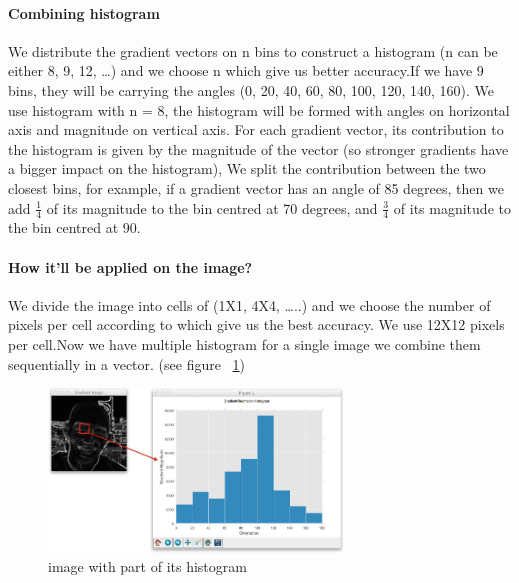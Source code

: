 \paragraph{}
\paragraph{Combining histogram}
We distribute the gradient vectors on n bins to construct a histogram (n can be either 8, 9, 12, …) and we choose n which give us better accuracy.\newline If we have 9 bins, they will be carrying the angles (0, 20, 40, 60, 80, 100, 120, 140, 160). \newline We use histogram with n = 8, the histogram will be formed with angles on horizontal axis and magnitude on vertical axis.
\newline For each gradient vector, its contribution to the histogram is given by the magnitude of the vector (so stronger gradients have a bigger impact on the histogram), We split the contribution between the two closest bins, for example, if a gradient vector has an angle of 85 degrees, then we add
\begin{math}
    \frac{1}{4}
\end{math} 
of its magnitude to the bin centred at 70 degrees, and 
\begin{math}
    \frac{3}{4} 
\end{math}
of its magnitude to the bin centred at 90.
\paragraph{}
\paragraph{How it’ll be applied on the image?}We divide the image into cells of (1X1, 4X4, …..) and we choose the number of pixels per cell according to which give us the best accuracy.\newline
We use 12X12 pixels per cell.\newline Now we have multiple histogram for a single image we combine them sequentially in a vector. (see figure ~\ref{fig:hist representation})
\begin{figure}
	\centering
	\includegraphics[width=0.70\textwidth]{histogram_ex.png}
	\caption{image with part of its histogram}
	\label{fig:hist representation}
\end{figure}
